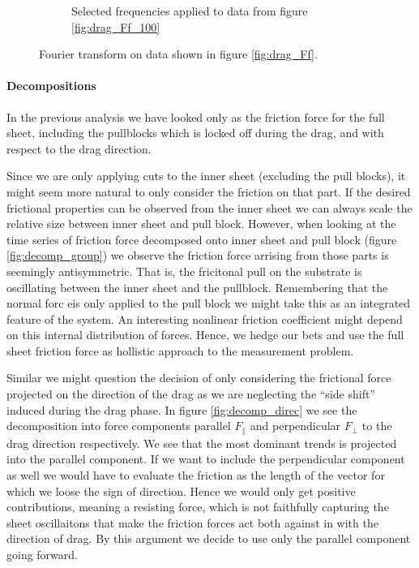 \begin{figure}[H]
\begin{subfigure}[b]{0.49\textwidth}
      \caption{Selected frequencies applied to data from figure \ref{fig:drag_Ff_100}}
      \label{fig:ft_b}
  \end{subfigure}
  \caption{Fourier transform on data shown in figure \ref{fig:drag_Ff}.}
  \label{fig:ft}
\end{figure}


\paragraph*{Decompositions}

In the previous analysis we have looked only as the friction force for the full
sheet, including the pullblocks which is locked off during the drag, and with
respect to the drag direction. \par
Since we are only applying cuts to the inner sheet (excluding the pull blocks),
it might seem more natural to only consider the friction on that part. If the
desired frictional properties can be observed from the inner sheet we can always
scale the relative size between inner sheet and pull block. However, when
looking at the time series of friction force decomposed onto inner sheet and
pull block (figure \ref{fig:decomp_group}) we observe the friction force arrising
from those parts is seemingly antisymmetric. That is, the fricitonal pull on the
substrate is oscillating between the inner sheet and the pullblock. Remembering
that the normal forc eis only applied to the pull block we might take this as an
integrated feature of the system. An interesting nonlinear friction coefficient
might depend on this internal distribution of forces. Hence, we hedge our bets and
use the full sheet friction force as hollistic approach to the measurement problem.

\par
Similar we might question the decision of
only considering the frictional force projected on the direction of the drag as
we are neglecting the ``side shift'' induced during the drag phase. In figure \ref{fig:decomp_direc} we see the decomposition into force components parallel $F_{\parallel}$ and perpendicular $F_{\perp}$ to the drag direction respectively. We see that the most dominant trends is projected into the parallel component. If we want to include the perpendicular component as well we would have to evaluate the friction as the length of the vector for which we loose the sign of direction. Hence we would only get positive contributions, meaning a resisting force, which is not faithfully capturing the sheet oscillaitons that make the friction forces act both against in with the direction of drag. By this argument we decide to use only the parallel component going forward. 

